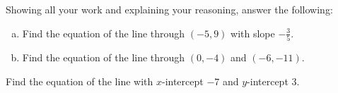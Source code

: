 \documentclass[11pt,letterpaper]{article}
\begin{document}

 Showing all your work and explaining your reasoning, answer the following:
	\begin{enumerate}[(a)]
	\item Find the equation of the line through $(-5, 9)$ with slope $-\frac{3}{5}$.
	\item Find the equation of the line through $(0, -4)$ and $(-6, -11)$. 
	\end{enumerate}



\newpage



 Find the equation of the line with $x$-intercept $-7$ and $y$-intercept 3. 
\end{document}
